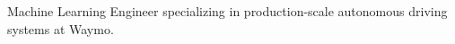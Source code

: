 
\begin{cvparagraph}
  Machine Learning Engineer specializing in production-scale autonomous driving
  systems at Waymo. 
\end{cvparagraph}